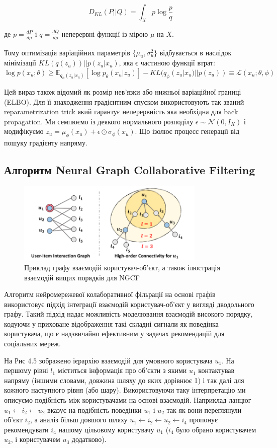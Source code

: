 \[ D_{KL}(P||Q) = \int_X p \log \frac {p}{q}\]

де $p = \frac{dP}{d\mu}$ і $q = \frac{dQ}{d\mu}$ неперервні функції із мірою $\mu$ на $X$.

Тому оптимізація варіаційних параметрів  $\{\mu_u, \sigma^{2}_u\}$ відбувається в наслідок  мінімізації  $ KL (q(z_u)) || p(z_u|x_u) $, яка є частиною функції втрат:
\[  \log p(x_u; \theta) \geq  \mathbb{E}_{q_{\phi}(z_u|x_u)} [ \log p_{\theta} (x_u|z_u)] -  KL (q_{\phi}(z_u|x_u) || p(z_u))  \equiv \mathcal{L}(x_u;\theta, \phi)\]

Цей вираз також відомий як розмір нев’язки або нижньої варіаційної границі (ELBO). Для її знаходження градієнтним спуском використовують так званий reparametrization trick який гарантує неперервність яка необхідна для back propagation. Ми семпюємо із деякого нормального розподілу  $\epsilon \sim \mathcal{N}(0, I_K)$ і модифікуємо $z_{u} = \mu_{\phi}(x_u) + \epsilon \odot \sigma_{\phi}(x_u)$. Що ізолює процесс генерації від пошуку градієнту напряму.
\subsection{Алгоритм Neural Graph Collaborative Filtering}
\begin{figure}
    \centering
    \includegraphics[width=0.8\textwidth]{images/interactions_graph.png}
    \caption{Приклад графу взаємодій користувач-об’єкт, а також ілюстрація взаємодій вищих порядків для NGCF }
\end{figure}
Алгоритм нейромережевої колаборативної фільрації на основі графів використовує підхід інтеграції взаємодій користувач-об’єкт у вигляді дводольного графу.
Такий підхід надає можливість моделювання взаємодій високого порядку, кодуючи у приховане відображення такі складні сигнали як поведінка користувача, що є надзвичайно ефективним у задачах рекомендацій для соціальних мереж.

На Рис 4.5 зображено ієрархію взаємодій для умовного користувача $u_1$. На першому рівні $l_1$ міститься інформація про об’єкти з якими $u_1$ контактував напряму (іншими словами, довжина шляху до яких дорівнює 1) і так далі для кожного наступного рівня (або шару). Використовуючи таку інтерпретацію ми описуємо подібність між користувачами на основі взаємодій. Наприклад ланцюг $u_1 \leftarrow i_2 \leftarrow u_2$ вказує на подібність поведінки $u_1$ і $u_2$ так як вони переглянули об’єкт $i_2$, а аналіз більш довшого шляху $u_1 \leftarrow i_2 \leftarrow u_2 \leftarrow i_4$ пропонує рекомендувати $i_4$ нашому цільовому користувачу $u_1$ ($i_4$ було обрано користувачем $u_2$,  і користувачем $u_3$ додатково).

